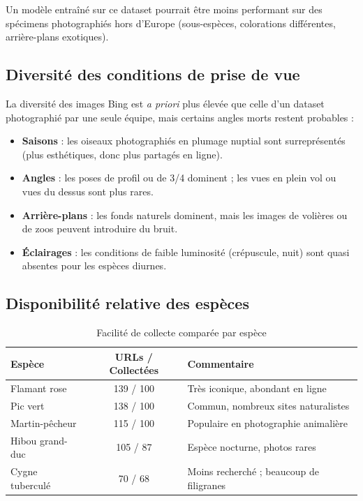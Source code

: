\documentclass[12pt,a4paper]{article}
\begin{document}
\begin{tcolorbox}[colback=danger!5, colframe=danger, title=Risque identifié]
  Un modèle entraîné sur ce dataset pourrait être moins performant sur des spécimens
  photographiés hors d'Europe (sous-espèces, colorations différentes, arrière-plans exotiques).
\end{tcolorbox}

\subsection{Diversité des conditions de prise de vue}

La diversité des images Bing est \textit{a priori} plus élevée que celle d'un dataset photographié
par une seule équipe, mais certains angles morts restent probables :

\begin{itemize}
  \item \textbf{Saisons} : les oiseaux photographiés en plumage nuptial sont surreprésentés
    (plus esthétiques, donc plus partagés en ligne).
  \item \textbf{Angles} : les poses de profil ou de 3/4 dominent ; les vues en plein vol ou
    vues du dessus sont plus rares.
  \item \textbf{Arrière-plans} : les fonds naturels dominent, mais les images de volières ou
    de zoos peuvent introduire du bruit.
  \item \textbf{Éclairages} : les conditions de faible luminosité (crépuscule, nuit)
    sont quasi absentes pour les espèces diurnes.
\end{itemize}

\subsection{Disponibilité relative des espèces}

\begin{table}[h!]
  \centering
  \caption{Facilité de collecte comparée par espèce}
  \renewcommand{\arraystretch}{1.3}
  \begin{tabular}{lcp{7cm}}
    \toprule
    \textbf{Espèce} & \textbf{URLs / Collectées} & \textbf{Commentaire} \\
    \midrule
    Flamant rose    & 139 / 100 & Très iconique, abondant en ligne \\
    Pic vert        & 138 / 100 & Commun, nombreux sites naturalistes \\
    Martin-pêcheur  & 115 / 100 & Populaire en photographie animalière \\
    Hibou grand-duc & 105 / 87  & Espèce nocturne, photos rares \\
    Cygne tuberculé &  70 / 68  & Moins recherché ; beaucoup de filigranes \\
    \bottomrule
  \end{tabular}
\end{table}
\end{document}
